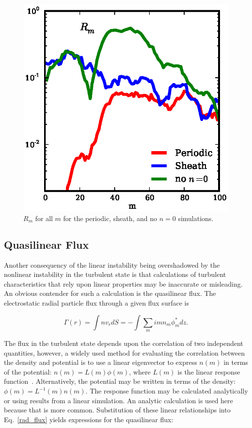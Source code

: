 \documentclass[showpacs,preprintnumbers,amsmath,amssymb,superscriptaddress,aip]{revtex4-1}
\def\beq{\begin{equation}}
\def\eeq{\end{equation}}
\begin{document}
\begin{figure}[!htbp]
\includegraphics[]{ratios}
\hfil
\caption{$R_m$ for all $m$ for the periodic, sheath, and no $n=0$ simulations.}
\label{ratios}
\end{figure}


\subsection{Quasilinear Flux}
\label{subsec_quasilinear}

Another consequency of the linear instability being overshadowed by the nonlinear instability in the turbulent state is that 
calculations of turbulent characteristics that rely upon linear properties may be
inaccurate or misleading. An obvious contender for such a calculation is the quasilinear flux.
The electrostatic radial particle flux through a given flux surface is

\beq
\label{rad_flux}
\Gamma(r) = \int n v_r dS = - \int \sum_m i m n_m \phi_m^* dz.
\eeq

The flux in the turbulent state depends upon the correlation of two independent quantities, however, a widely used method for evaluating the correlation between the density and potential is
to use a linear eigenvector to express $n(m)$ in terms of the potential: $n(m) = L(m) \phi(m)$, where $L(m)$ is the linear response function~\cite{terry2006a}. Alternatively, the potential
may be written in terms of the density: $\phi(m) = L^{-1}(m) n(m)$. The response function may be calculated analytically or using results from a linear simulation. An analytic calculation
is used here because that is more common.
Substitution of these linear relationships into Eq.~\ref{rad_flux} yields expressions for the quasilinear flux:
\end{document}
